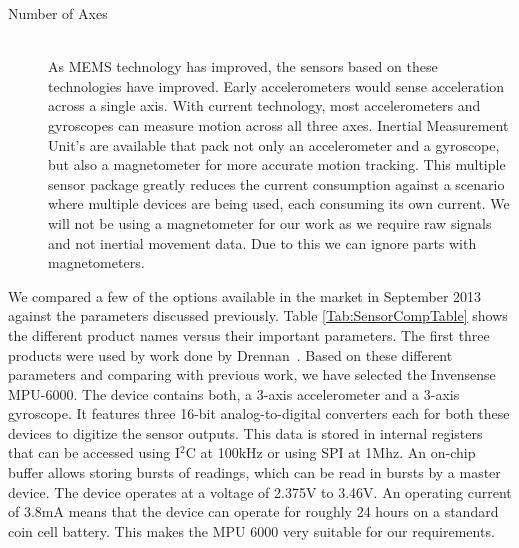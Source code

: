 \begin{description}
\item[Number of Axes] \hfill \\
As MEMS technology has improved, the sensors based on these technologies have improved.
Early accelerometers would sense acceleration across a single axis.
With current technology, most accelerometers and gyroscopes can measure motion across all three axes.
Inertial Measurement Unit's are available that pack not only an accelerometer and a gyroscope,
but also a magnetometer for more accurate motion tracking.
This multiple sensor package greatly reduces the current consumption against a scenario where multiple devices are being used, each consuming its own current.
We will not be using a magnetometer for our work as we require raw signals and not inertial movement data.
Due to this we can ignore parts with magnetometers.
\end{description}
We compared a few of the options available in the market in September 2013 against the parameters discussed previously.
Table \ref{Tab:SensorCompTable} shows the different product names versus their important parameters.
The first three products were used by work done by Drennan~\cite{drennan2010assessment}.
Based on these different parameters and comparing with previous work,
we have selected the Invensense MPU-6000.
The device contains both,
a 3-axis accelerometer and a 3-axis gyroscope.
It features three 16-bit analog-to-digital converters each for both these devices to digitize the sensor outputs.
This data is stored in internal registers that can be accessed using I$^{2}$C at 100kHz or using SPI at 1Mhz.
An on-chip buffer allows storing bursts of readings, which can be read in bursts by a master device.
The device operates at a voltage of 2.375V to 3.46V.
An operating current of 3.8mA means that the device can operate for roughly 24 hours on a standard coin cell battery.
This makes the MPU 6000 very suitable for our requirements.


